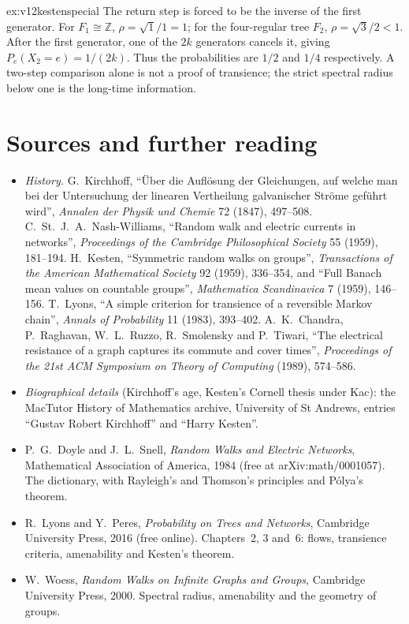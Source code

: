 \begin{solution}{ex:v12kestenspecial}
\idea The return step is forced to be the inverse of the first generator.
\writeup For $F_1\cong\mathbb Z$, $\rho=\sqrt1/1=1$; for the four-regular tree $F_2$, $\rho=\sqrt3/2<1$. After the first generator, one of the $2k$ generators cancels it, giving $P_e(X_2=e)=1/(2k)$. Thus the probabilities are $1/2$ and $1/4$ respectively. A two-step comparison alone is not a proof of transience; the strict spectral radius below one is the long-time information.
\end{solution}

\section*{Sources and further reading}

\begin{itemize}
\item \emph{History.} G.~Kirchhoff, ``\"Uber die Aufl\"osung der Gleichungen, auf welche man bei der Untersuchung der linearen Vertheilung galvanischer Str\"ome gef\"uhrt wird'', \emph{Annalen der Physik und Chemie} 72 (1847),
497--508. C.~St.~J.~A.~Nash-Williams, ``Random walk and electric currents in networks'', \emph{Proceedings of the Cambridge Philosophical Society} 55 (1959), 181--194. H.~Kesten, ``Symmetric random walks on groups'',
\emph{Transactions of the American Mathematical Society} 92 (1959), 336--354, and ``Full Banach mean values on countable groups'', \emph{Mathematica Scandinavica} 7 (1959), 146--156. T.~Lyons, ``A simple criterion for
transience of a reversible Markov chain'', \emph{Annals of Probability} 11 (1983), 393--402. A.~K.~Chandra, P.~Raghavan, W.~L.~Ruzzo, R.~Smolensky and P.~Tiwari, ``The electrical resistance of a graph captures its commute
and cover times'', \emph{Proceedings of the 21st ACM Symposium on Theory of Computing} (1989), 574--586.
\item \emph{Biographical details} (Kirchhoff's age, Kesten's Cornell thesis under Kac): the MacTutor History of Mathematics archive, University of St Andrews, entries ``Gustav Robert Kirchhoff'' and ``Harry Kesten''.
\item P.~G.~Doyle and J.~L.~Snell, \emph{Random Walks and Electric Networks}, Mathematical Association of America, 1984 (free at arXiv:math/0001057). The dictionary, with Rayleigh's and Thomson's principles and P\'olya's theorem.
\item R.~Lyons and Y.~Peres, \emph{Probability on Trees and Networks}, Cambridge University Press, 2016 (free online). Chapters~2, 3 and~6: flows, transience criteria, amenability and Kesten's theorem.
\item W.~Woess, \emph{Random Walks on Infinite Graphs and Groups}, Cambridge University Press, 2000. Spectral radius, amenability and the geometry of groups.
\end{itemize}
